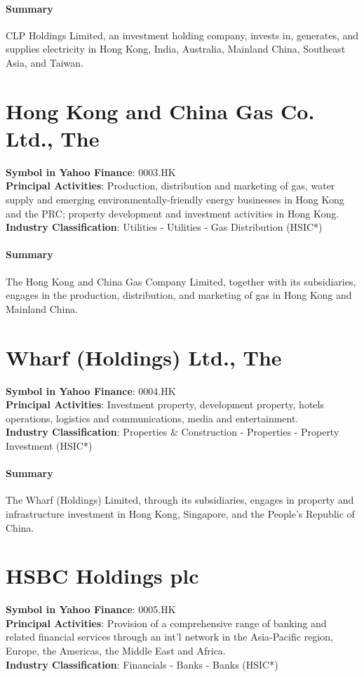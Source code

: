 \paragraph{Summary}
CLP Holdings Limited, an investment holding company, invests in, generates, and supplies electricity in Hong Kong, India, Australia, Mainland China, Southeast Asia, and Taiwan.


\section{Hong Kong and China Gas Co. Ltd., The}
\textbf{Symbol in Yahoo Finance}: 0003.HK\\
\textbf{Principal Activities}: Production, distribution and marketing of gas, water supply and emerging environmentally-friendly energy businesses in Hong Kong and the PRC; property development and investment activities in Hong Kong.\\
\textbf{Industry Classification}: Utilities - Utilities - Gas Distribution (HSIC*)
\paragraph{Summary}
The Hong Kong and China Gas Company Limited, together with its subsidiaries, engages in the production, distribution, and marketing of gas in Hong Kong and Mainland China.


\section{Wharf (Holdings) Ltd., The}
\textbf{Symbol in Yahoo Finance}: 0004.HK\\
\textbf{Principal Activities}: Investment property, development property, hotels operations, logistics and communications, media and entertainment.\\
\textbf{Industry Classification}: Properties \& Construction - Properties - Property Investment (HSIC*)
\paragraph{Summary}
The Wharf (Holdings) Limited, through its subsidiaries, engages in property and infrastructure investment in Hong Kong, Singapore, and the People's Republic of China.


\section{HSBC Holdings plc}
\textbf{Symbol in Yahoo Finance}: 0005.HK\\
\textbf{Principal Activities}: Provision of a comprehensive range of banking and related financial services through an int'l network in the Asia-Pacific region, Europe, the Americas, the Middle East and Africa.\\
\textbf{Industry Classification}: Financials - Banks - Banks (HSIC*)
